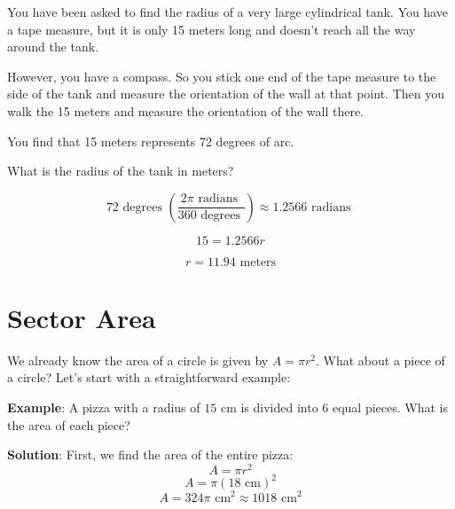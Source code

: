\begin{Exercise}[title={Arc Length}, label=arc_length]

You have been asked to find the radius of a very large cylindrical tank.
You have a tape measure, but it is only 15 meters long and doesn't
reach all the way around the tank.

However, you have a compass.  So you stick one end of the tape measure
to the side of the tank and measure the orientation of the wall at
that point.  Then you walk the 15 meters and measure the orientation of the 
wall there.

You find that 15 meters represents 72 degrees of arc.

What is the radius of the tank in meters?
  
\end{Exercise}
\begin{Answer}[ref=arc_length]

  $$72 \text{ degrees } \left(\frac{2\pi \text{ radians }}{360 \text{ degrees }
  }\right) \approx 1.2566 \text{ radians }$$

  $$15 = 1.2566r$$

  $$r = 11.94 \text{ meters}$$
  
\end{Answer}

\section{Sector Area}
We already know the area of a circle is given by $A = \pi r^2$. What about a 
piece of a circle? Let's start with a straightforward example:

\textbf{Example}: A pizza with a radius of $15$ cm is divided into 6 equal 
pieces. What is the area of each piece?

\textbf{Solution}: First, we find the area of the entire pizza:
$$A = \pi r^2$$
$$A = \pi (18\text{ cm})^2$$
$$A = 324\pi\text{ cm}^2 \approx 1018\text{ cm}^2$$

